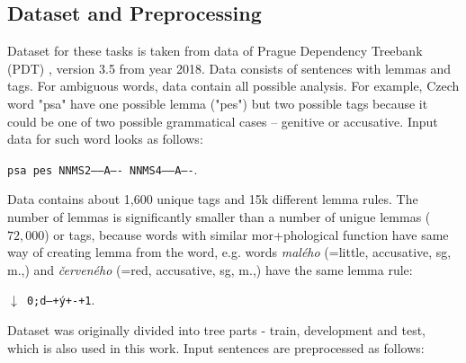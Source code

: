 


\subsection{Dataset and Preprocessing}
\label{sub:dataset}
Dataset for these tasks is taken from data of Prague Dependency Treebank (PDT) \citep{PDT35}, version 3.5 from year 2018. Data consists of sentences with lemmas and tags. For ambiguous words, data contain all possible analysis. For example, Czech word "psa" have one possible lemma ("pes") but two possible tags because it could be one of two possible grammatical cases -- genitive or accusative. Input data for such word looks as follows: \\
\begin{center}
\texttt{psa pes NNMS2-----A---- NNMS4-----A----}.
\end{center}
Data contains about 1,600 unique tags and 15k different lemma rules. The number of lemmas is significantly smaller than a number of unigue lemmas ($72,000$) \citep{Strakova} or tags, because words with similar mor+phological function have same way of creating lemma from the word, e.g. words \textit{malého} (=little, accusative,  sg, m.,) and \textit{červeného}  (=red, accusative,  sg, m.,) have the same lemma rule:
\begin{center}
\texttt{$\downarrow$ 0;d\textbrokenbar ---+ý+-+1}.
\end{center} 
\par
Dataset was originally divided into tree parts - train, development and test, which is also used in this work. Input sentences are preprocessed as follows:
